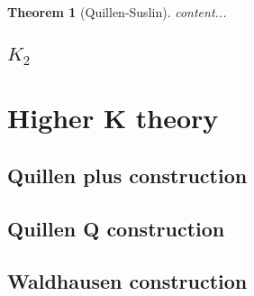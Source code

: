 \documentclass[12pt]{article}
\numberwithin{equation}{section}
\newtheorem{theorem}{Theorem}[section]
\begin{document}
	\begin{theorem}[Quillen-Suslin]
		content...
	\end{theorem}
	\subsection{$K_2$}
	
	\section{Higher K theory}
	\subsection{Quillen plus construction}
	\subsection{Quillen Q construction}
	\subsection{Waldhausen construction}
	
\end{document}

